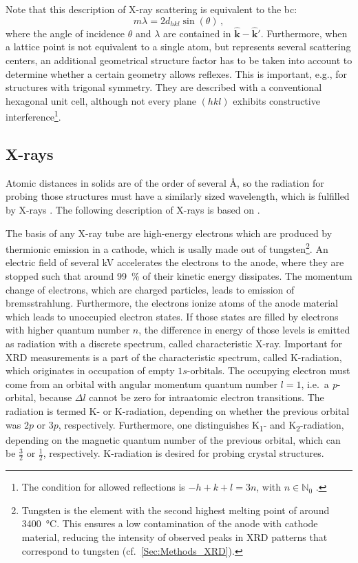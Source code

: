 Note that this description of X-ray scattering is equivalent to the \gls{bc}:
\begin{equation}\label{Equ:Theory_BraggCondition}
    m\lambda=2d_{hkl}\sin(\theta)\,,
\end{equation}
where the angle of incidence $\theta$ and $\lambda$ are contained in $\hat{\mathbf{k}}-\hat{\mathbf{k}}'$.
Furthermore, when a lattice point is not equivalent to a single atom, but represents several scattering centers, an additional geometrical structure factor has to be taken into account to determine whether a certain geometry allows reflexes.
This is important, e.g., for structures with trigonal symmetry. 
They are described with a conventional hexagonal unit cell, although not every plane $(hkl)$ exhibits constructive interference\footnote{
    The condition for allowed reflections is $-h+k+l=3n$, with $n\in\mathbb{N}_0$ \cite{grundmann2021}.
}.

\subsection{X-rays}\label{Sec:Theory_XRays}
Atomic distances in solids are of the order of several \si{\angstrom}, so the radiation for probing those structures must have a similarly sized wavelength, which is fulfilled by X-rays
    \cite{harrington2021}.
The following description of X-rays is based on \textcite{spiess2009}.

The basis of any X-ray tube are high-energy electrons which are produced by thermionic emission in a cathode, which is usally made out of tungsten\footnote{
    Tungsten is the element with the second highest melting point of around \qty{3400}{\celsius}.
    This ensures a low contamination of the anode with cathode material, reducing the intensity of observed peaks in \gls{XRD} patterns that correspond to tungsten (cf.\ \ref{Sec:Methods_XRD}). 
}.
An electric field of several \si{\kV} accelerates the electrons to the anode, where they are stopped such that around \qty{99}{\percent} of their kinetic energy dissipates.
The momentum change of electrons, which are charged particles, leads to emission of bremsstrahlung.
Furthermore, the electrons ionize atoms of the anode material which leads to unoccupied electron states.
If those states are filled by electrons with higher quantum number $n$, the difference in energy of those levels is emitted as radiation with a discrete spectrum, called characteristic X-ray.
Important for \gls{XRD} measurements is a part of the characteristic spectrum, called K-radiation, which originates in occupation of empty $1s$-orbitals.
The occupying electron must come from an orbital with angular momentum quantum number $l=1$, i.e.\ a \textit{p}-orbital, because $\Delta l$ cannot be zero for intraatomic electron transitions.
The radiation is termed K\textalpha- or K\textbeta-radiation, depending on whether the previous orbital was $2p$ or $3p$, respectively.
Furthermore, one distinguishes K\textalpha\textsubscript{1}- and K\textalpha\textsubscript{2}-radiation, depending on the magnetic quantum number of the previous orbital, which can be $\frac{3}{2}$ or $\frac{1}{2}$, respectively.
K\textalpha-radiation is desired for probing crystal structures.